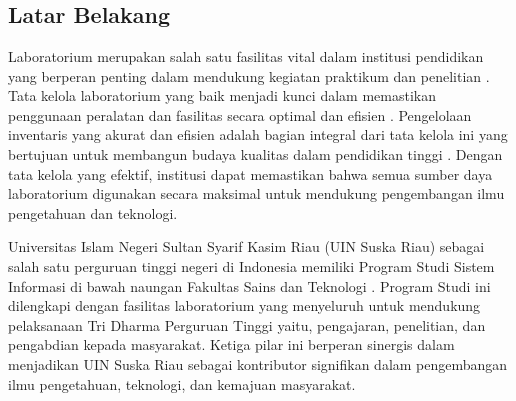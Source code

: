 %
%
%
%

\chapter{\babSatu}

\section{Latar Belakang}
Laboratorium merupakan salah satu fasilitas vital dalam institusi pendidikan yang berperan penting dalam mendukung kegiatan praktikum dan penelitian \cite{la2021comparison}. Tata kelola laboratorium yang baik menjadi kunci dalam memastikan penggunaan peralatan dan fasilitas secara optimal dan efisien \cite{abrantes2020governance}. Pengelolaan inventaris yang akurat dan efisien adalah bagian integral dari tata kelola ini yang bertujuan untuk membangun budaya kualitas dalam pendidikan tinggi \cite{abrantes2020governance}. Dengan tata kelola yang efektif, institusi dapat memastikan bahwa semua sumber daya laboratorium digunakan secara maksimal untuk mendukung pengembangan ilmu pengetahuan dan teknologi.

Universitas Islam Negeri Sultan Syarif Kasim Riau (UIN Suska Riau) sebagai salah satu perguruan tinggi negeri di Indonesia memiliki Program Studi Sistem Informasi di bawah naungan Fakultas Sains dan Teknologi \cite{uin-suska-website}. Program Studi ini dilengkapi dengan fasilitas laboratorium yang menyeluruh untuk mendukung pelaksanaan Tri Dharma Perguruan Tinggi yaitu, pengajaran, penelitian, dan pengabdian kepada masyarakat. Ketiga pilar ini berperan sinergis dalam menjadikan UIN Suska Riau sebagai kontributor signifikan dalam pengembangan ilmu pengetahuan, teknologi, dan kemajuan masyarakat.

